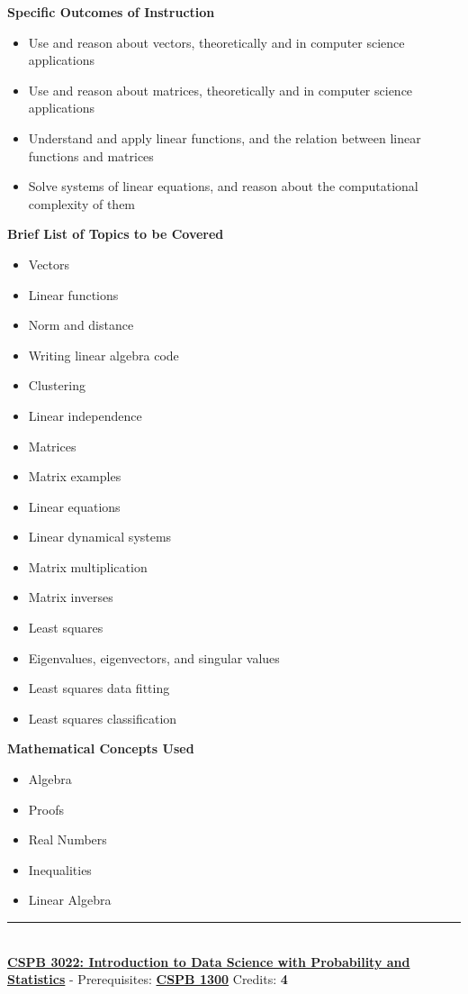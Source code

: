 \documentclass{article}
\newcommand{\horizontalline}{\noindent \rule{\textwidth}{0.5pt} \\}
\begin{document}
\noindent \textbf{Specific Outcomes of Instruction}
\begin{itemize}
    \item Use and reason about vectors, theoretically and in computer science applications
    \item Use and reason about matrices, theoretically and in computer science applications
    \item Understand and apply linear functions, and the relation between linear functions and matrices
    \item Solve systems of linear equations, and reason about the computational complexity of them
\end{itemize}

\noindent \textbf{Brief List of Topics to be Covered}
\begin{itemize}
    \item Vectors
    \item Linear functions
    \item Norm and distance
    \item Writing linear algebra code
    \item Clustering
    \item Linear independence
    \item Matrices
    \item Matrix examples
    \item Linear equations
    \item Linear dynamical systems
    \item Matrix multiplication
    \item Matrix inverses
    \item Least squares
    \item Eigenvalues, eigenvectors, and singular values
    \item Least squares data fitting
    \item Least squares classification
\end{itemize}

\noindent \textbf{Mathematical Concepts Used}
\begin{itemize}
    \item Algebra
    \item Proofs
    \item Real Numbers
    \item Inequalities
    \item Linear Algebra
\end{itemize}
\horizontalline
\noindent \href{https://www.colorado.edu/program/cspb/cspb-3022-introduction-data-science-probability-and-statistics}{\textbf{CSPB 3022: Introduction to Data Science with Probability and Statistics}} - Prerequisites: \href{https://www.colorado.edu/program/cspb/cspb-1300-computer-science-1-starting-computing}{\textbf{CSPB 1300}} Credits: \textbf{4} \\ 
\end{document}
